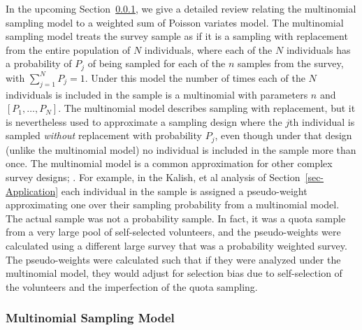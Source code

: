 \documentclass[AMA,STIX1COL]{WileyNJD-v2}
\begin{document}
In the upcoming Section~\ref{sec-MultPoisson}, we give a detailed review relating the multinomial sampling model  to a weighted sum of Poisson variates model.
The multinomial sampling model treats the survey sample as if it is a sampling with replacement from the entire population of $N$ individuals, where each of the $N$
individuals has a probability of $P_j$ of being sampled for each of the $n$ samples from the survey, with $\sum_{j=1}^{N} P_j = 1$. Under this model the number of times each of the $N$ individuals
is included in the sample is a multinomial with parameters $n$ and $[P_1,\ldots, P_N]$.
The multinomial model describes sampling with replacement, but it is nevertheless used to approximate a sampling design where the $j$th  individual is sampled {\it without} replacement with probability $P_j$, even though under that design (unlike the multinomial model) no individual is included in the sample more than once. The multinomial model is a common approximation for other complex survey designs; \citep[see e.g., ][p. 14]{Korn:1999}.
For example, in the  Kalish, et al\cite{Kali:2021} analysis of Section~\ref{sec-Application} each individual in the sample is assigned a pseudo-weight approximating one over their sampling probability from
a multinomial model. The actual sample was not a probability sample. In fact, it was a quota sample from a very large pool of self-selected volunteers, and the pseudo-weights were calculated using a different large survey that was a probability weighted survey. The pseudo-weights were calculated such that if they were analyzed under the multinomial model, they would adjust for selection bias due to self-selection of the volunteers and the imperfection of the quota sampling.

\subsubsection{Multinomial Sampling Model}
\label{sec-MultPoisson}
\end{document}
